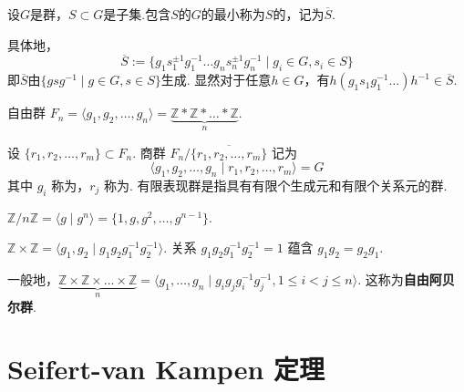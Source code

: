\begin{definition}[正规闭包][def:10.23]
    设$G$是群，$S\subset G$是子集.包含$S$的$G$的最小称为$S$的，记为$\overline{S}$.
    
    具体地，
    \[ \overline{S}:=\{ g_1 s_1^{\pm 1} g_1^{-1} \dots g_n s_n^{\pm 1} g_n^{-1} \mid g_i\in G, s_i\in S \} \]
    即$\overline{S}$由$\{ gsg^{-1} \mid g\in G, s\in S \}$生成.
    显然对于任意$h\in G$，有$h \left( g_1 s_1 g_1^{-1} \dots \right) h^{-1}\in \overline{S}$.
\end{definition}

\begin{definition}[自由群II][def:10.24]
    自由群 $F_n = \langle g_1, g_2, \dots, g_n \rangle = \underbrace{\mathbb{Z} * \mathbb{Z} * \dots * \mathbb{Z}}_{n}$.
\end{definition}

\begin{definition}[有限表现群][def:10.25]
    设 $\{r_1, r_2, \dots, r_m\} \subset F_n$.
    商群 $F_n / \overline{\{r_1, r_2, \dots, r_m\}}$ 记为
    \[ \langle g_1, g_2, \dots, g_n \mid r_1, r_2, \dots, r_m \rangle = G \]
    其中 $g_i$ 称为，$r_j$ 称为.
    有限表现群是指具有有限个生成元和有限个关系元的群.
\end{definition}

\begin{instance}
    $\mathbb{Z}/n\mathbb{Z} = \langle g \mid g^n \rangle = \{ 1, g, g^2, \dots, g^{n-1} \}$.
\end{instance}

\begin{instance}
    $\mathbb{Z} \times \mathbb{Z} = \langle g_1, g_2 \mid g_1 g_2 g_1^{-1} g_2^{-1} \rangle$.
    关系 $g_1 g_2 g_1^{-1} g_2^{-1} = 1$ 蕴含 $g_1 g_2 = g_2 g_1$.\par
    一般地，$\underbrace{\mathbb{Z} \times \mathbb{Z} \times \dots \times \mathbb{Z}}_{n} = \langle g_1, \dots, g_n \mid g_i g_j g_i^{-1} g_j^{-1}, 1 \leq i < j \leq n \rangle$.
    这称为\textbf{自由阿贝尔群}.
\end{instance}

\section{Seifert-van Kampen 定理}

